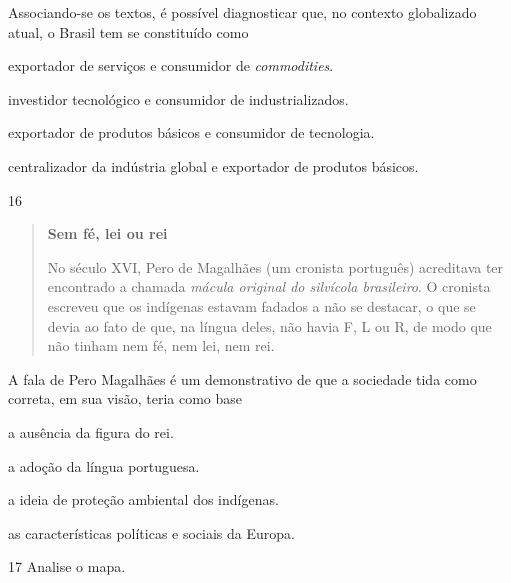 Associando-se os textos, é possível diagnosticar que, no contexto
globalizado atual, o Brasil tem se constituído como

\begin{escolha}
\item
  exportador de serviços e consumidor de \textit{commodities}.
\item
  investidor tecnológico e consumidor de industrializados.
\item
  exportador de produtos básicos e consumidor de tecnologia.
\item
  centralizador da indústria global e exportador de produtos básicos.
\end{escolha}

\num{16} 

\begin{quote}
\textbf{Sem fé, lei ou rei}

No século XVI, Pero de Magalhães (um cronista português) acreditava ter encontrado a chamada \textit{mácula original do silvícola brasileiro}. O cronista escreveu que os indígenas estavam fadados a não se destacar, o que se devia ao fato de que, na língua deles, não havia F, L ou R, de modo que não tinham nem fé, nem lei, nem rei.

\end{quote}

A fala de Pero Magalhães é um demonstrativo de que a sociedade tida como
correta, em sua visão, teria como base

\begin{escolha}
\item
  a ausência da figura do rei.
\item
  a adoção da língua portuguesa.
\item
  a ideia de proteção ambiental dos indígenas.
\item
  as características políticas e sociais da Europa.
\end{escolha}

\num{17} Analise o mapa.

